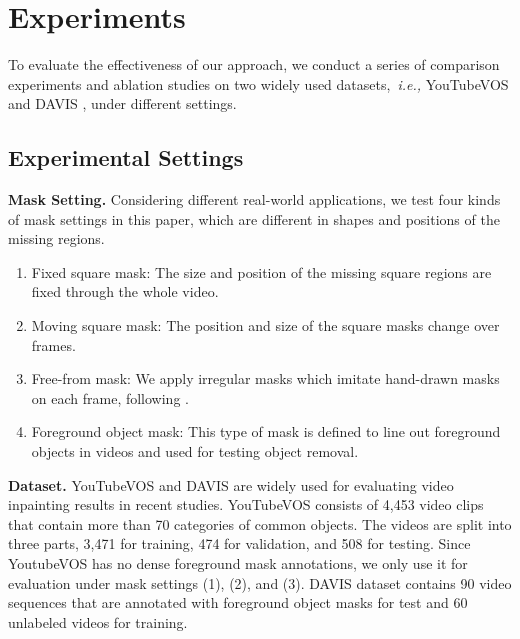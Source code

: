 
\section{Experiments}\label{sec:exp}
To evaluate the effectiveness of our approach, we conduct a series of comparison experiments and ablation studies on two widely used datasets,~\emph{i.e.,} YouTubeVOS \cite{xu2018Youtube} and DAVIS \cite{davis_2017}, under different settings.

\subsection{Experimental Settings}
\noindent \textbf{Mask Setting.} Considering different real-world applications, we test four kinds of mask settings in this paper, which are different in shapes and positions of the missing regions. 
\begin{enumerate}
\item Fixed square mask: The size and position of the missing square regions are fixed through the whole video. 
\item Moving square mask: The position and size of the square masks change over frames. 
\item Free-from mask: We apply irregular masks which imitate hand-drawn masks on each frame, following \cite{liu2018partialinpainting}. 
\item Foreground object mask: This type of mask is defined to line out foreground objects in videos and used for testing object removal.
\end{enumerate}

\noindent\textbf{Dataset.} 
YouTubeVOS and DAVIS are widely used for evaluating video inpainting results in recent studies.
YouTubeVOS consists of 4,453 video clips that contain more than 70 categories of common objects. 
The videos are split into three parts, 3,471 for training, 474 for validation, and 508 for testing. Since YoutubeVOS has no dense foreground mask annotations, we only use it for evaluation under mask settings (1), (2), and (3). 
% 
DAVIS dataset contains 90 video sequences that are annotated with foreground object masks for test and 60 unlabeled videos for training.


